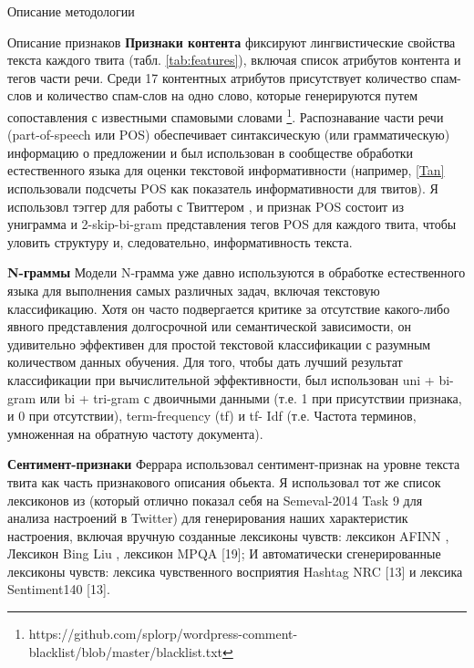 \begin{section}{Описание методологии}
\begin{subsection}{Описание признаков}
    \textbf{Признаки контента} фиксируют лингвистические свойства текста каждого твита (табл. \ref{tab:features}), включая список атрибутов контента и тегов части речи.
     Среди 17 контентных атрибутов присутствует количество спам-слов и количество спам-слов на одно слово, которые генерируются путем сопоставления с известными спамовыми словами \footnote{https://github.com/splorp/wordpress-comment-blacklist/blob/master/blacklist.txt}.
     Распознавание части речи (part-of-speech или POS) обеспечивает
     синтаксическую (или грамматическую) информацию о предложении и
     был использован в сообществе обработки естественного языка для оценки текстовой информативности (например, \ref{Tan} использовали подсчеты POS как показатель информативности для твитов). Я использовл тэггер для работы с Твиттером \cite{Gimpel}, и признак POS состоит из униграмма и 2-skip-bi-gram представления тегов POS для каждого твита, чтобы уловить структуру и, следовательно, информативность текста.

     \textbf{N-граммы}
     Модели N-грамма уже давно используются в обработке естественного языка для выполнения самых различных задач, включая текстовую классификацию. Хотя он часто подвергается критике за отсутствие какого-либо явного представления долгосрочной или семантической зависимости, он удивительно эффективен для простой текстовой классификации с разумным количеством данных обучения. Для того, чтобы дать лучший результат классификации при вычислительной эффективности, был использован uni + bi-gram или bi + tri-gram с двоичными данными (т.е. 1 при присутствии признака, и 0 при отсутствии), term-frequency (tf) и tf- Idf (т.е. Частота терминов, умноженная на обратную частоту документа).

     \textbf{Сентимент-признаки}
     Феррара \cite{Ferrara} использовал сентимент-признак на уровне текста твита как часть признакового описания обьекта. Я использовал тот же список лексиконов из \cite{Mohammad} (который отлично показал себя на Semeval-2014 Task 9 для анализа настроений в Twitter) для генерирования наших характеристик настроения, включая вручную созданные лексиконы чувств: лексикон AFINN \cite{Nielsen} , Лексикон Bing Liu \cite{Liu}, лексикон MPQA [19]; И автоматически сгенерированные лексиконы чувств: лексика чувственного восприятия Hashtag NRC [13] и лексика Sentiment140 [13].


\end{subsection}
\end{section}
